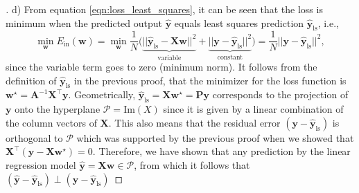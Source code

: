 \documentclass{article}
\renewcommand{\vec}[1]{\mathbf{#1}}
\begin{document}
    \begin{proof}[\unskip\nopunct]
        d) From equation \eqref{eqn:loss_least_squares}, it can be seen that 
        the loss is minimum when the predicted output $\hat{\vec{y}}$ equals 
        least squares prediction 
        $\hat{\vec{y}}_{\text{ls}}$, i.e.,
        \[
            \min_{\vec{w}} E_{\text{in}}(\vec{w})=\min_{\vec{w}}\frac{1}{N}
            \big(\underbrace{||\hat{\vec{y}}_{\text{ls}}-\vec{X}\vec{w}||^2}_
            {\text{variable}} + \underbrace{||\vec{y}-\hat{\vec{y}}_
            {\text{ls}}||^2}_{\text{constant}}\big) = \frac{1}{N}||\vec{y}
            -\hat{\vec{y}}_{\text{ls}}||^2,
        \]
        since the variable term goes to zero (minimum norm). It follows from 
        the definition of $\hat{\vec{y}}_{\text{ls}}$ in the previous proof, 
        that the minimizer for the loss function is $\vec{w}^\star 
        = \vec{A}^{-1}\vec{X}^\top\vec{y}$. Geometrically, 
        $\hat{\vec{y}}_{\text{ls}}=\vec{X}\vec{w}^\star = \vec{P}\vec{y}$ 
        corresponds to the projection of $\vec{y}$ onto the hyperplane 
        $\mathcal{P} = \text{Im}(X)$ since it is given by a linear 
        combination of the column vectors of $\vec{X}$. This also means that
        the residual error $(\vec{y}-\hat{\vec{y}}_{\text{ls}})$ is 
        orthogonal to $\mathcal{P}$ which was supported by the previous proof 
        when we showed that $\vec{X}^\top(\vec{y}-\vec{X}\vec{w}^\star) = 0$. 
        Therefore, we have shown that any prediction by the linear regression 
        model $\hat{\vec{y}}=\vec{X} \vec{w}\in\mathcal{P}$, from which it 
        follows that $(\hat{\vec{y}}-\hat{\vec{y}}_{\text{ls}})\perp
        (\vec{y}-\hat{\vec{y}}_{\text{ls}})$
    \end{proof}
\end{document}
